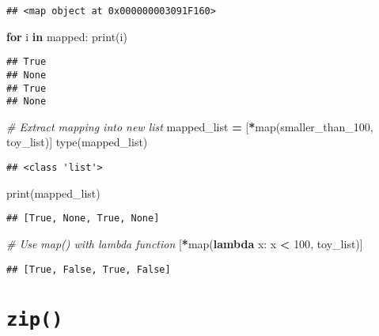 \documentclass[
]{book}
\newenvironment{Shaded}{\begin{snugshade}}{\end{snugshade}}
\newcommand{\BuiltInTok}[1]{#1}
\newcommand{\CommentTok}[1]{\textcolor[rgb]{0.56,0.35,0.01}{\textit{#1}}}
\newcommand{\ControlFlowTok}[1]{\textcolor[rgb]{0.13,0.29,0.53}{\textbf{#1}}}
\newcommand{\DecValTok}[1]{\textcolor[rgb]{0.00,0.00,0.81}{#1}}
\newcommand{\KeywordTok}[1]{\textcolor[rgb]{0.13,0.29,0.53}{\textbf{#1}}}
\newcommand{\NormalTok}[1]{#1}
\newcommand{\OperatorTok}[1]{\textcolor[rgb]{0.81,0.36,0.00}{\textbf{#1}}}
\begin{document}
\begin{verbatim}
## <map object at 0x000000003091F160>
\end{verbatim}

\begin{Shaded}
\begin{Highlighting}[]
\ControlFlowTok{for}\NormalTok{ i }\KeywordTok{in}\NormalTok{ mapped:}
    \BuiltInTok{print}\NormalTok{(i)}
\end{Highlighting}
\end{Shaded}

\begin{verbatim}
## True
## None
## True
## None
\end{verbatim}

\begin{Shaded}
\begin{Highlighting}[]
\CommentTok{\# Extract mapping into new list}
\NormalTok{mapped\_list }\OperatorTok{=}\NormalTok{ [}\OperatorTok{*}\BuiltInTok{map}\NormalTok{(smaller\_than\_100, toy\_list)]}
\BuiltInTok{type}\NormalTok{(mapped\_list)}
\end{Highlighting}
\end{Shaded}

\begin{verbatim}
## <class 'list'>
\end{verbatim}

\begin{Shaded}
\begin{Highlighting}[]
\BuiltInTok{print}\NormalTok{(mapped\_list)}
\end{Highlighting}
\end{Shaded}

\begin{verbatim}
## [True, None, True, None]
\end{verbatim}

\begin{Shaded}
\begin{Highlighting}[]
\CommentTok{\# Use map() with lambda function}
\NormalTok{[}\OperatorTok{*}\BuiltInTok{map}\NormalTok{(}\KeywordTok{lambda}\NormalTok{ x: x }\OperatorTok{\textless{}} \DecValTok{100}\NormalTok{, toy\_list)]}
\end{Highlighting}
\end{Shaded}

\begin{verbatim}
## [True, False, True, False]
\end{verbatim}

\hypertarget{zip}{%
\section{\texorpdfstring{\texttt{zip()}}{zip()}}\label{zip}}
\end{document}
